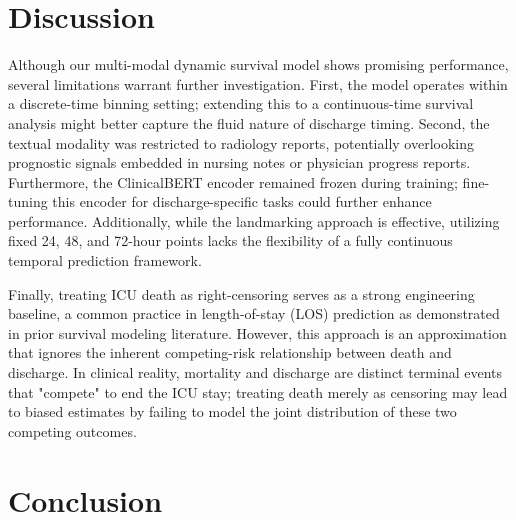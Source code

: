 \documentclass[10pt, a4paper]{article}
\begin{document}
\section{Discussion}
\label{sec:discussion}

Although our multi-modal dynamic survival model shows promising performance, several limitations warrant further investigation. First, the model operates within a discrete-time binning setting; extending this to a continuous-time survival analysis might better capture the fluid nature of discharge timing. Second, the textual modality was restricted to radiology reports, potentially overlooking prognostic signals embedded in nursing notes or physician progress reports. Furthermore, the ClinicalBERT encoder remained frozen during training; fine-tuning this encoder for discharge-specific tasks could further enhance performance. Additionally, while the landmarking approach is effective, utilizing fixed 24, 48, and 72-hour points lacks the flexibility of a fully continuous temporal prediction framework.

Finally, treating ICU death as right-censoring serves as a strong engineering baseline, a common practice in length-of-stay (LOS) prediction as demonstrated in prior survival modeling literature. However, this approach is an approximation that ignores the inherent competing-risk relationship between death and discharge. In clinical reality, mortality and discharge are distinct terminal events that "compete" to end the ICU stay; treating death merely as censoring may lead to biased estimates by failing to model the joint distribution of these two competing outcomes.

\section{Conclusion}
\label{sec:conclusion}
\end{document}
